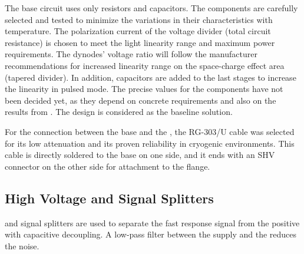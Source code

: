 The  base circuit uses only resistors and capacitors. The components are carefully selected and tested to minimize the variations in their characteristics with temperature. The polarization current of the voltage divider (total circuit resistance) is chosen to meet the  light linearity range and maximum power requirements. The dynodes' voltage ratio will follow the manufacturer recommendations for increased linearity range on the space-charge effect area (tapered divider). In addition, capacitors are added to the last stages to increase the  linearity in pulsed mode. The precise values for the components have not been decided yet, as they depend on concrete requirements and also on the results from . The  %
design is considered as the baseline solution.

For the connection between the  base and the \fdth, the RG-303/U cable was selected for its low attenuation and its proven reliability in cryogenic environments. %
This cable is directly soldered to the  base on one side, and it ends with an SHV connector on the other side for attachment to the flange. 

\subsection{High Voltage and Signal Splitters}
\label{sec:fddp-pd-4.2}

 and signal splitters %
are used to separate the fast  response signal from the positive  with capacitive decoupling. %
A low-pass filter between the  supply and the  %
reduces the noise.

